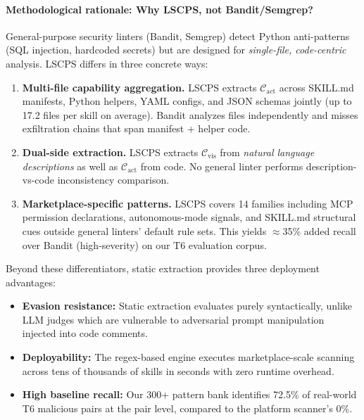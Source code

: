 \paragraph{Methodological rationale: Why LSCPS, not Bandit/Semgrep?}
General-purpose security linters (Bandit, Semgrep) detect Python anti-patterns
(SQL injection, hardcoded secrets) but are designed for \emph{single-file,
code-centric} analysis. LSCPS differs in three concrete ways:

\begin{enumerate}[topsep=2pt, itemsep=2pt]
\item \textbf{Multi-file capability aggregation.}
  LSCPS extracts $\mathcal{C}_{\text{act}}$ across SKILL.md manifests,
  Python helpers, YAML configs, and JSON schemas jointly (up to 17.2 files
  per skill on average). Bandit analyzes files independently and misses
  exfiltration chains that span manifest + helper code.
\item \textbf{Dual-side extraction.}
  LSCPS extracts $\mathcal{C}_{\text{vis}}$ from \emph{natural language
  descriptions} as well as $\mathcal{C}_{\text{act}}$ from code.
  No general linter performs description-vs-code inconsistency comparison.
\item \textbf{Marketplace-specific patterns.}
  LSCPS covers 14 families including MCP permission declarations,
  autonomous-mode signals, and SKILL.md structural cues outside general linters'
  default rule sets. This yields $\approx$35\% added recall over Bandit
  (high-severity) on our T6 evaluation corpus.
\end{enumerate}

Beyond these differentiators, static extraction provides three deployment advantages:
\begin{itemize}
    \item \textbf{Evasion resistance:} Static extraction evaluates purely
      syntactically, unlike LLM judges which are vulnerable to adversarial
      prompt manipulation injected into code comments.
    \item \textbf{Deployability:} The regex-based engine executes
      marketplace-scale scanning across tens of thousands
      of skills in seconds with zero runtime overhead.
    \item \textbf{High baseline recall:} Our 300+ pattern bank identifies
      72.5\% of real-world T6 malicious pairs at the pair level,
      compared to the platform scanner's 0\%.
\end{itemize}

